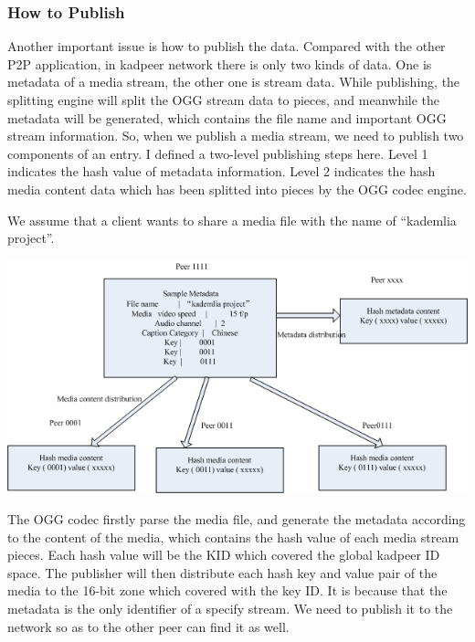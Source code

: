 {\subsubsection{How to Publish}
Another important issue is how to publish the data.
Compared with the other P2P application, in kadpeer network there is only two kinds of data.
One is metadata of a media stream, the other one is stream data.
While publishing, the splitting engine will split the OGG stream data to pieces, and meanwhile the metadata will be generated, which contains the file name and important OGG stream information.
So, when we publish a media stream, we need to publish two components of an entry.
I defined a two-level publishing steps here.
Level 1 indicates the hash value of metadata information.
Level 2 indicates the hash media content data which has been splitted into pieces by the OGG codec engine.

We assume that a client wants to share a media file with the name of ``kademlia project''.
\begin{center}
\includegraphics[width=15cm]{data/Distribution.png}
\end{center}
The OGG codec firstly parse the media file, and generate the metadata according to the content of the media, which contains the hash value of each media stream pieces.
Each hash value will be the KID which covered the global kadpeer ID space.
The publisher will then distribute each hash key and value pair of the media to the 16-bit zone which covered with the key ID.
It is because that the metadata is the only identifier of a specify stream.
We need to publish it to the network so as to the other peer can find it as well.


}

